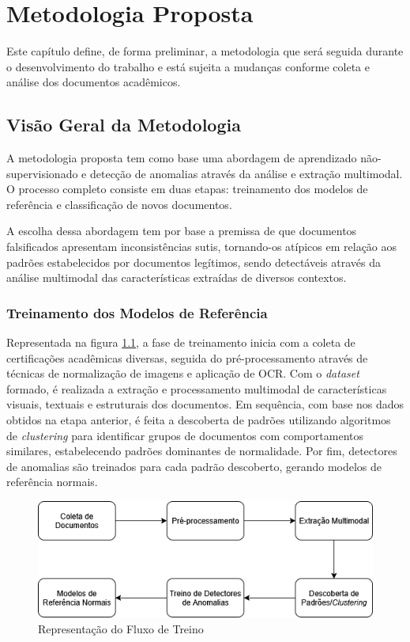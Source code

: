 \chapter{Metodologia Proposta}

Este capítulo define, de forma preliminar, a metodologia que será seguida durante o desenvolvimento do trabalho e está sujeita a mudanças conforme coleta e análise dos documentos acadêmicos.

\section{Visão Geral da Metodologia}

A metodologia proposta tem como base uma abordagem de aprendizado não-supervisionado e detecção de anomalias através da análise e extração multimodal. O processo completo consiste em duas etapas: treinamento dos modelos de referência e classificação de novos documentos.

A escolha dessa abordagem tem por base a premissa de que documentos falsificados apresentam inconsistências sutis, tornando-os atípicos em relação aos padrões estabelecidos por documentos legítimos, sendo detectáveis através da análise multimodal das características extraídas de diversos contextos.

\subsection{Treinamento dos Modelos de Referência}

Representada na figura \ref{fig:fluxotreino}, a fase de treinamento inicia com a coleta de certificações acadêmicas diversas, seguida do pré-processamento através de técnicas de normalização de imagens e aplicação de OCR. Com o \textit{dataset} formado, é realizada a extração e processamento multimodal de características visuais, textuais e estruturais dos documentos. Em sequência, com base nos dados obtidos na etapa anterior, é feita a descoberta de padrões utilizando algoritmos de \textit{clustering} para identificar grupos de documentos com comportamentos similares, estabelecendo padrões dominantes de normalidade. Por fim, detectores de anomalias são treinados para cada padrão descoberto, gerando modelos de referência normais.

\begin{figure}[H]
	\caption{\label{fig:fluxotreino}Representação do Fluxo de Treino}
    \begin{center}
    \includegraphics[width=1\linewidth]{images/FluxoTreino.png}
	\end{center}
\end{figure}

